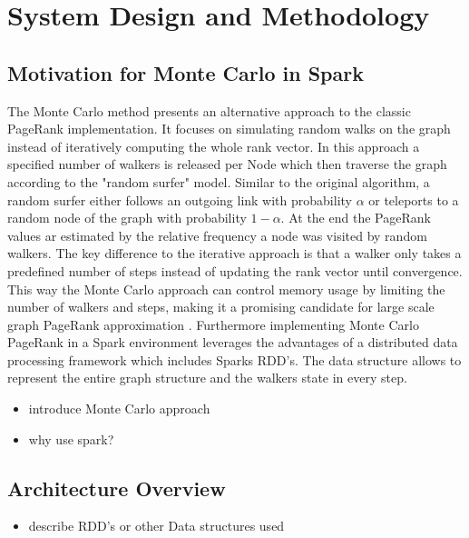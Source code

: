 \section{System Design and Methodology}
\subsection{Motivation for Monte Carlo in Spark}
The Monte Carlo method presents an alternative approach to the classic PageRank implementation. It focuses on simulating random walks on the graph instead of iteratively computing the whole rank vector. In this approach a specified number of walkers is released per Node which then traverse the graph according to the "random surfer" model. Similar to the original algorithm, a random surfer either follows an outgoing link with probability $\alpha$ or teleports to a random node of the graph with probability $1-\alpha$. At the end the PageRank values ar estimated by the relative frequency a node was visited by random walkers. The key difference to the iterative approach is that a walker only takes a predefined number of steps instead of updating the rank vector until convergence. This way the Monte Carlo approach can control memory usage by limiting the number of walkers and steps, making it a promising candidate for large scale graph PageRank approximation \cite{avrachenkov_monte_2007}. Furthermore implementing Monte Carlo PageRank in a Spark environment leverages the advantages of a distributed data processing framework which includes Sparks RDD's. The data structure allows to represent the entire graph structure and the walkers state in every step.



\begin{itemize}
    \item introduce Monte Carlo approach
    \item why use spark?
\end{itemize}

\subsection{Architecture Overview}
\begin{itemize}
    \item describe RDD's or other Data structures used
\end{itemize}


